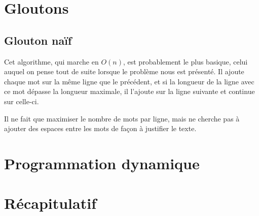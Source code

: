 \documentclass{article}
\begin{document}
\section{Gloutons}

\subsection{Glouton naïf}

Cet algorithme, qui marche en $O(n)$, est probablement le plus basique, celui
auquel on pense tout de suite lorsque le problème nous est présenté. Il ajoute
chaque mot sur la même ligne que le précédent, et si la longueur de la ligne
avec ce mot dépasse la longueur maximale, il l'ajoute sur la ligne suivante et
continue sur celle-ci.

Il ne fait que maximiser le nombre de mots par ligne, mais ne cherche pas à
ajouter des espaces entre les mots de façon à justifier le texte.

\section{Programmation dynamique}

\section{Récapitulatif}
\end{document}
